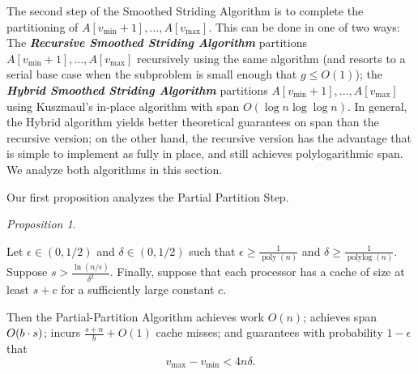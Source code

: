 \documentclass[11pt]{article}
\DeclarePairedDelimiter{\paren}{(}{)}
\newcommand{\poly}{\operatorname{poly}}
\newcommand{\polylog}{\operatorname{polylog}}
\newcommand{\defn}[1]{{\textit{\textbf{\boldmath #1}}} }
\renewcommand{\paragraph}[1]{\vspace{0.09in}\noindent{\bf \boldmath #1.}}
\theoremstyle{remark}
\newtheorem{proposition}[thm]{Proposition}
\theoremstyle{remark}
\begin{document}
The second step of the Smoothed Striding Algorithm is to complete the
partitioning of $A[v_{\text{min}} + 1], \ldots, A[v_{\text{max}}]$. This can be
done in one of two ways: The \defn{Recursive Smoothed Striding Algorithm}
partitions $A[v_{\text{min}} + 1], \ldots, A[v_{\text{max}}]$ recursively using
the same algorithm (and resorts to a serial base case when the subproblem is
small enough that $g \le O(1)$); the \defn{Hybrid Smoothed Striding Algorithm}
partitions $A[v_{\text{min}} + 1], \ldots, A[v_{\text{max}}]$ using Kuszmaul's
in-place algorithm with span $O(\log n \log \log n)$. In general, the Hybrid
algorithm yields better theoretical guarantees on span than the recursive
version; on the other hand, the recursive version has the advantage that is
simple to implement as fully in place, and still achieves polylogarithmic span.
We analyze both algorithms in this section.



\paragraph{Algorithm Analysis} Our first proposition analyzes the Partial Partition Step.
\begin{proposition}
  \label{prop:generalResult}
  
  Let $\epsilon \in (0, 1/2)$ and $\delta \in (0, 1/2)$ such that
  $\epsilon \ge \frac{1}{\poly(n)}$ and $\delta \ge
  \frac{1}{\polylog(n)}$. Suppose $s > \frac{\ln
    (n/\epsilon)}{\delta^2}$. Finally, suppose that each processor has
  a cache of size at least $s + c$ for a sufficiently large constant
  $c$.

  Then the Partial-Partition Algorithm achieves work $O(n)$; achieves
  span $O\paren*{b \cdot s}$; incurs $\frac{s+n}{b} + O(1)$ cache
  misses; and guarantees with probability $1 - \epsilon$ that
  $$v_{\text{max}}-v_{\text{min}} < 4 n \delta.$$
\end{proposition}
\end{document}
